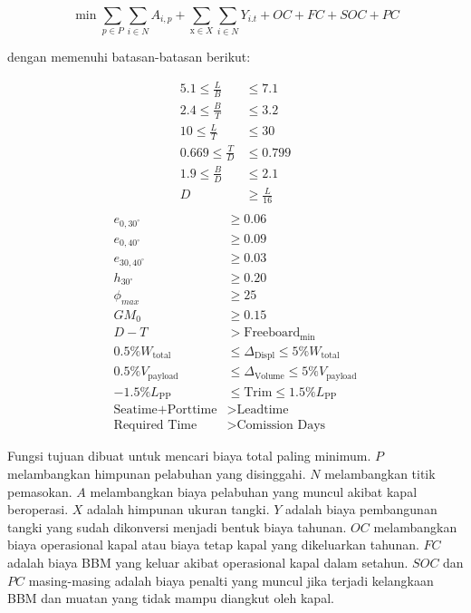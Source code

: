     \begin{equation}
        \min\sum_{p\in P}\sum_{i\in N}A_{i,p}+\sum_{\mathrm{x}\in X}\sum_{i\in N}Y_{i.t}+OC+FC+SOC+PC
        \label{model-matematis-optimasi}
    \end{equation}

     dengan memenuhi batasan-batasan berikut:

\begin{align}
    5.1 \leq \frac{L}{B} &\leq 7.1 \label{crasio1} \\
    2.4 \leq \frac{B}{T} &\leq 3.2 \label{crasio2} \\
    10 \leq \frac{L}{T} &\leq 30 \label{crasio3} \\
    0.669 \leq \frac{T}{D} &\leq 0.799 \label{crasio4} \\
    1.9 \leq \frac{B}{D} &\leq 2.1 \label{crasio5} \\
    D &\geq \frac{L}{16} \label{crasio6} \\
\end{align}
\begin{align}
    e_{0,30^\circ} &\geq 0.06 \label{cstabil1} \\
    e_{0,40^\circ} &\geq 0.09 \label{cstabil2} \\
    e_{30,40^\circ} &\geq 0.03 \label{cstabil3} \\
    h_{30^\circ} &\geq 0.20 \label{cstabil4} \\
    \phi_{max} &\geq 25 \label{cstabil5} \\
    GM_0 &\geq 0.15 \label{cstabil6} \\
    D - T &> \text{Freeboard}_{\text{min}} \label{cfreeboard} \\
    0.5\% W_{\text{total}} &\leq \Delta_{\text{Displ}} \leq 5\% W_{\text{total}} \label{cberatkapal} \\
    0.5\% V_{\text{payload}} &\leq \Delta_{\text{Volume}} \leq 5\% V_{\text{payload}} \label{cvolumekapal} \\
    -1.5\% L_{\text{PP}} &\leq \text{Trim} \leq 1.5\% L_{\text{PP}} \label{ctrim} \\
    \text{Seatime} + \text{Porttime} &> \text{Leadtime} \label{cwaktu1} \\
    \text{Required Time} &> \text{Comission Days} \label{cwaktu2}
\end{align}

    Fungsi tujuan dibuat untuk mencari biaya total paling minimum. $P$ melambangkan himpunan pelabuhan yang disinggahi. $N$ melambangkan titik pemasokan. $A$ melambangkan biaya pelabuhan yang muncul akibat kapal beroperasi. $X$ adalah himpunan ukuran tangki. $Y$ adalah biaya pembangunan tangki yang sudah dikonversi menjadi bentuk biaya tahunan. $OC$ melambangkan biaya operasional kapal atau biaya tetap kapal yang dikeluarkan tahunan. $FC$ adalah biaya BBM yang keluar akibat operasional kapal dalam setahun. $SOC$ dan $PC$ masing-masing adalah biaya penalti yang muncul jika terjadi kelangkaan BBM dan muatan yang tidak mampu diangkut oleh kapal.

